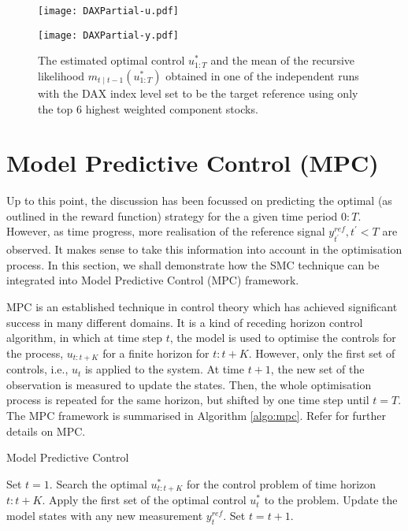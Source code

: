 \begin{figure}[htbp]
\centering
    \begin{minipage}{0.5\textwidth}
        \centering
        \texttt{[image: DAXPartial-u.pdf]}
    \end{minipage}%
    \begin{minipage}{0.5\textwidth}
        \centering
        \texttt{[image: DAXPartial-y.pdf]}
    \end{minipage}
\caption{The estimated optimal control $u^*_{1:T}$ and the mean of the recursive likelihood $m_{t \mid t-1}(u^*_{1:T})$ obtained in one of the independent runs with the DAX index level set to be the target reference using only the top $6$ highest weighted component stocks.}
\label{fig:daxpartial}
\end{figure}

\section{Model Predictive Control (MPC)}
Up to this point, the discussion has been focussed on predicting the optimal (as outlined in the reward function) strategy for the a given time period $0:T$. However, as time progress, more realisation of the reference signal $y^{ref}_{t^\prime}, t^\prime < T$ are observed. It makes sense to take this information into account in the optimisation process. In this section, we shall demonstrate how the SMC technique can be integrated into Model Predictive Control (MPC) framework.

MPC is an established technique in control theory which has achieved significant success in many different domains. It is a kind of receding horizon control algorithm, in which at time step $t$, the model is used to optimise the controls for the process, $u_{t:t+K}$ for a finite horizon for $t:t+K$. However, only the first set of controls, i.e., $u_{t}$ is applied to the system. At time $t+1$, the new set of the observation is measured to update the states. Then, the whole optimisation process is repeated for the same horizon, but shifted by one time step until $t=T$. The MPC framework is summarised in Algorithm \ref{algo:mpc}. Refer \cite{RJB09,MJM02} for further details on MPC. 

\begin{algorithm}
\caption{Model Predictive Control}\label{algo:mpc}
\begin{algorithmic}[1]
\State Set $t = 1$.
\State Search the optimal $u^*_{t:t+K}$ for the control problem of time horizon $t:t+K$.
\State Apply the first set of the optimal control  $u^*_{t}$ to the problem.
\State Update the model states with any new measurement $y^{ref}_t$.
\State Set $t = t + 1$.
\EndWhile
\EndFunction
\end{algorithmic}
\end{algorithm}

